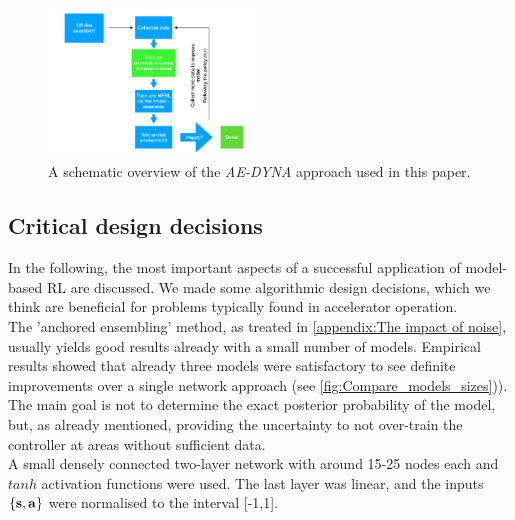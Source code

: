 \documentclass[
reprint,
amsmath,amssymb,amsfonts,clevref,
aps,
prstab,
]{revtex4-2}
\begin{document}
	\begin{figure}[!h]
		\centering
		\includegraphics*[width=0.5\textwidth]{Figures/MBRL_overview}
		\caption{A schematic overview of the \emph{AE-DYNA} approach used in this paper.}
		\label{fig:MBRL_overview}
	\end{figure}
	\subsection{Critical design decisions}\label{ss:critical_design}
In the following, the most important aspects of a successful application of model-based RL are discussed. We made some algorithmic design decisions, which we think are beneficial for problems typically found in accelerator operation.\\
The 'anchored ensembling' method, as treated in \cref{appendix:The impact of noise}, usually yields good results already with a small number of models. Empirical results showed that already three models were satisfactory to see definite improvements over a single network approach (see \cref{fig:Compare_models_sizes})). The main goal is not to determine the exact posterior probability of the model, but, as already mentioned, providing the uncertainty to not over-train the controller at areas without sufficient data.\\ A small densely connected two-layer network with around 15-25 nodes each and $tanh$ activation functions were used. The last layer was linear, and the inputs $\{\mathbf{s},\mathbf{a}\}$ were normalised to the interval [-1,1].\\
\end{document}
